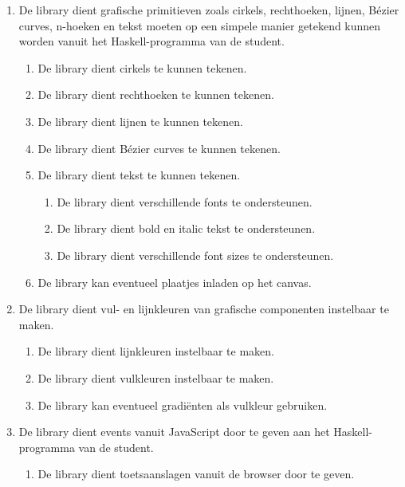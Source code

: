 \begin{enumerate}[label={R\arabic*}]
	\item \label{req:prim} De library dient grafische primitieven zoals cirkels, rechthoeken, lijnen, Bézier curves, n-hoeken en tekst moeten op een simpele manier getekend kunnen worden vanuit het Haskell-programma van de student.
	\begin{enumerate}[label={R\arabic{enumi}.\arabic*}]
		\item \label{req:circle} De library dient cirkels te kunnen tekenen.
		\item \label{req:rect} De library dient rechthoeken te kunnen tekenen.
		\item \label{req:lines} De library dient lijnen te kunnen tekenen.
		\item \label{req:bezier} De library dient Bézier curves te kunnen tekenen.
		\item \label{req:text} De library dient tekst te kunnen tekenen.
		\begin{enumerate}[label={R\arabic{enumi}.\arabic{enumii}.\arabic*}]
			\item De library dient verschillende fonts te ondersteunen.
			\item De library dient bold en italic tekst te ondersteunen.
			\item De library dient verschillende font sizes te ondersteunen.
		\end{enumerate}
		\item \label{req:pictures} De library kan eventueel plaatjes inladen op het canvas.
	\end{enumerate}
	\item De library dient vul- en lijnkleuren van grafische componenten instelbaar te maken.
	\begin{enumerate}[label={R\arabic{enumi}.\arabic*}]
		\item \label{req:colors:lines} De library dient lijnkleuren instelbaar te maken.
		\item \label{req:colors:fill} De library dient vulkleuren instelbaar te maken.
		\item \label{req:colors:fill:gradient} De library kan eventueel gradiënten als vulkleur gebruiken.
	\end{enumerate}
	\item De library dient events vanuit JavaScript door te geven aan het Haskell-programma van de student.
	\begin{enumerate}[label={R\arabic{enumi}.\arabic*}]
		\item \label{req:event:key} De library dient toetsaanslagen vanuit de browser door te geven.

\end{enumerate}
\end{enumerate}
